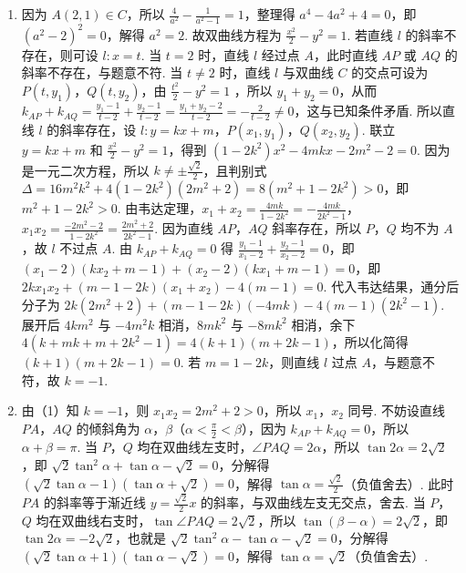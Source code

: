 \begin{solution}
\begin{enumerate}
\item 因为 \(A(2,1)\in C\)，所以 \(\frac{4}{a^2}-\frac{1}{a^2-1}=1\)，整理得 \(a^4-4a^2+4=0\)，即 \(\left(a^2-2\right)^2=0\)，解得 \(a^2=2\).
故双曲线方程为 \(\frac{x^2}{2}-y^2=1\).
若直线 \(l\) 的斜率不存在，则可设 \(l:x=t\).
当 \(t=2\) 时，直线 \(l\) 经过点 \(A\)，此时直线 \(AP\) 或 \(AQ\) 的斜率不存在，与题意不符.
当 \(t\ne 2\) 时，直线 \(l\) 与双曲线 \(C\) 的交点可设为 \(P(t,y_1)\)，\(Q(t,y_2)\)，由 \(\frac{t^2}{2}-y^2=1\) ，所以 \(y_1+y_2=0\)，从而 \(k_{AP}+k_{AQ}=\frac{y_1-1}{t-2}+\frac{y_2-1}{t-2}=\frac{y_1+y_2-2}{t-2}=-\frac{2}{t-2}\ne 0\)，这与已知条件矛盾.
所以直线 \(l\) 的斜率存在，设 \(l:y=kx+m\)，\(P(x_1,y_1)\)，\(Q(x_2,y_2)\).
联立 \(y=kx+m\) 和 \(\frac{x^2}{2}-y^2=1\)，得到 \(\left(1-2k^2\right)x^2-4mkx-2m^2-2=0\).
因为是一元二次方程，所以 \(k\ne \pm \frac{\sqrt2}{2}\)，且判别式 \(\Delta=16m^2k^2+4\left(1-2k^2\right)\left(2m^2+2\right)=8\left(m^2+1-2k^2\right)>0\)，即 \(m^2+1-2k^2>0\).
由韦达定理，\(x_1+x_2=\frac{4mk}{1-2k^2}=-\frac{4mk}{2k^2-1}\)，\(x_1x_2=\frac{-2m^2-2}{1-2k^2}=\frac{2m^2+2}{2k^2-1}\).
因为直线 \(AP\)，\(AQ\) 斜率存在，所以 \(P\)，\(Q\) 均不为 \(A\)，故 \(l\) 不过点 \(A\).
由 \(k_{AP}+k_{AQ}=0\) 得 \(\frac{y_1-1}{x_1-2}+\frac{y_2-1}{x_2-2}=0\)，即 \(\left(x_1-2\right)\left(kx_2+m-1\right)+\left(x_2-2\right)\left(kx_1+m-1\right)=0\)，即 \(2kx_1x_2+(m-1-2k)\left(x_1+x_2\right)-4(m-1)=0\).
代入韦达结果，通分后分子为 \(2k\left(2m^2+2\right)+(m-1-2k)(-4mk)-4(m-1)\left(2k^2-1\right)\).
展开后 \(4km^2\) 与 \(-4m^2k\) 相消，\(8mk^2\) 与 \(-8mk^2\) 相消，余下 \(4(k+mk+m+2k^2-1)=4(k+1)(m+2k-1)\)，所以化简得 \((k+1)(m+2k-1)=0\).
若 \(m=1-2k\)，则直线 \(l\) 过点 \(A\)，与题意不符，故 \(k=-1\).
\item 由（1）知 \(k=-1\)，则 \(x_1x_2=2m^2+2>0\)，所以 \(x_1\)，\(x_2\) 同号.
不妨设直线 \(PA\)，\(AQ\) 的倾斜角为 \(\alpha\)，\(\beta\)（\(\alpha<\frac{\pi}{2}<\beta\)），因为 \(k_{AP}+k_{AQ}=0\)，所以 \(\alpha+\beta=\pi\).
当 \(P\)，\(Q\) 均在双曲线左支时，\(\angle PAQ=2\alpha\)，所以 \(\tan 2\alpha=2\sqrt2\)，即 \(\sqrt2\tan^2\alpha+\tan\alpha-\sqrt2=0\)，分解得 \(\left(\sqrt2\tan\alpha-1\right)(\tan\alpha+\sqrt2)=0\)，解得 \(\tan\alpha=\frac{\sqrt2}{2}\)（负值舍去）.
此时 \(PA\) 的斜率等于渐近线 \(y=\frac{\sqrt2}{2}x\) 的斜率，与双曲线左支无交点，舍去.
当 \(P\)，\(Q\) 均在双曲线右支时，\(\tan\angle PAQ=2\sqrt2\)，所以 \(\tan(\beta-\alpha)=2\sqrt2\)，即 \(\tan 2\alpha=-2\sqrt2\)，也就是 \(\sqrt2\tan^2\alpha-\tan\alpha-\sqrt2=0\)，分解得 \(\left(\sqrt2\tan\alpha+1\right)(\tan\alpha-\sqrt2)=0\)，解得 \(\tan\alpha=\sqrt2\)（负值舍去）.

\end{enumerate}
\end{solution}
